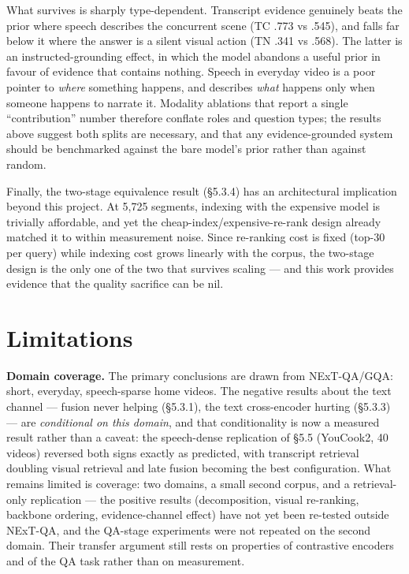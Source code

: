 What survives is sharply type-dependent. Transcript evidence genuinely
beats the prior where speech describes the concurrent scene (TC .773 vs
.545), and falls far below it where the answer is a silent visual action
(TN .341 vs .568). The latter is an instructed-grounding effect, in
which the model abandons a useful prior in favour of evidence that
contains nothing. Speech in everyday video is a poor pointer to
\emph{where} something happens, and describes \emph{what} happens only
when someone happens to narrate it. Modality ablations that report a
single ``contribution'' number therefore conflate roles and question
types; the results above suggest both splits are necessary, and that any
evidence-grounded system should be benchmarked against the bare model's
prior rather than against random.

Finally, the two-stage equivalence result (§5.3.4) has an architectural
implication beyond this project. At 5,725 segments, indexing with the
expensive model is trivially affordable, and yet the
cheap-index/expensive-re-rank design already matched it to within
measurement noise. Since re-ranking cost is fixed (top-30 per query)
while indexing cost grows linearly with the corpus, the two-stage design
is the only one of the two that survives scaling --- and this work
provides evidence that the quality sacrifice can be nil.

\section{Limitations}

\textbf{Domain coverage.} The primary conclusions are drawn from
NExT-QA/GQA: short, everyday, speech-sparse home videos. The negative
results about the text channel --- fusion never helping (§5.3.1), the
text cross-encoder hurting (§5.3.3) --- are \emph{conditional on this
domain}, and that conditionality is now a measured result rather than a
caveat: the speech-dense replication of §5.5 (YouCook2, 40 videos)
reversed both signs exactly as predicted, with transcript retrieval
doubling visual retrieval and late fusion becoming the best
configuration. What remains limited is coverage: two domains, a small
second corpus, and a retrieval-only replication --- the positive results
(decomposition, visual re-ranking, backbone ordering, evidence-channel
effect) have not yet been re-tested outside NExT-QA, and the QA-stage
experiments were not repeated on the second domain. Their transfer
argument still rests on properties of contrastive encoders and of the QA
task rather than on measurement.

